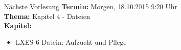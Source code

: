 \documentclass[aspectratio=43]{beamer}
\begin{document}
\begin{frame}[plain]
\begin{alertblock}{Nächste Vorlesung}
\textbf{Termin:} Morgen, 18.10.2015 9:20 Uhr\\
\textbf{Thema:} Kapitel 4 - Dateien \\
\textbf{Kapitel:} 
\begin{itemize}
\item LXES 6 Datein: Aufzucht und Pflege
\end{itemize}
\end{alertblock}
\end{frame}

\materialframe
\end{document}

